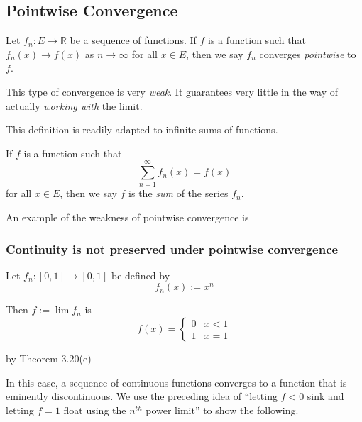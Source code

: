 \subsection{Pointwise Convergence}

\begin{definition} 
    Let $f_n: E \rightarrow \mathbb{R}$ be a sequence of functions. 
    If $f$ is a function such that $f_n(x) \to f(x)$ as $n \to \infty$ for all $x \in E$, then we say $f_n$ converges \textit{pointwise} to $f$.
\end{definition}

This type of convergence is very \textit{weak}. It guarantees very little in the way of actually \textit{working with} the limit.

This definition is readily adapted to infinite sums of functions.

\begin{definition}
    If $f$ is a function such that 
    \[\sum_{n=1}^\infty f_n(x) = f(x)\] 
    for all $x \in E$, then we say $f$ is the \textit{sum} of the series $f_n$.
\end{definition}

An example of the weakness of pointwise convergence is

\subsubsection{Continuity is not preserved under pointwise convergence}
\begin{example} 
    Let $f_n: [0, 1] \rightarrow [0, 1]$ be defined by
    \[f_n(x) := x^n\]

    Then $f := \lim f_n$ is 
    \[f(x) = \begin{cases}
        0 & x < 1 \\
        1 & x = 1
    \end{cases}\]

    by Theorem 3.20(e)
\end{example}

In this case, a sequence of continuous functions converges to a function that is eminently discontinuous. We use the preceding idea of ``letting $f < 0$ sink and letting $f = 1$ float using the $n^{th}$ power limit'' to show the following.

